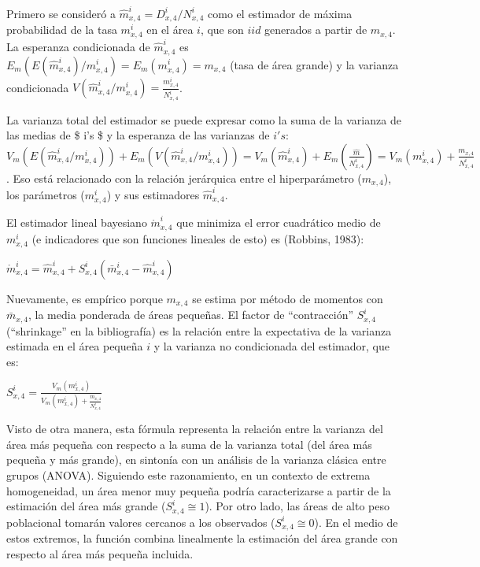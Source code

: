 \documentclass[12pt,]{article}
\begin{document}
Primero se consideró a \(\hat{m}_{x,4}^{i}=D_{x,4}^{i}/N_{x,4}^{i}\)
como el estimador de máxima probabilidad de la tasa \(m_{x,4}^{i}\) en
el área \(i\), que son \(iid\) generados a partir de \(m_{x,4}\). La
esperanza condicionada de \(\hat{m}_{x,4}^{i}\) es
\(E_{m}(E({\hat{m}}_{x,4}^{i})/m_{x,4}^{i})=E_{m}({m_{x, 4}^{i}}) = m_{x,4}\)
(tasa de área grande) y la varianza condicionada
\(V({\hat{m}}_{x,4}^{i}/m_{x,4}^{i})=\frac{m_{x,4}^{i}}{N_{x,4}^{i}}\).

La varianza total del estimador se puede expresar como la suma de la
varianza de las medias de \$ i's \$ y la esperanza de las varianzas de
\(i's\):
\(V_{m}(E(\hat{m}_{x,4}^{i}/m_{x,4}^{i}))+E_{m}(V({\hat{m}}_{x,4}^ {i}/m_{x,4}^{i}))=V_{m}(\hat{m}_{x,4}^{i})+E_{m}(\frac{{\hat{m}}}{N_{x,4}^{i}})=V_{m}(m_{x,4}^{i})+\frac{m_{x, 4}}{N_{x,4}^{i}}\).
Eso está relacionado con la relación jerárquica entre el hiperparámetro
(\(m_{x, 4}\)), los parámetros (\(m_{x,4}^{i}\)) y sus estimadores
\(\hat{m}_{x,4}^{i}\).

El estimador lineal bayesiano \(\mathring{m}_{x, 4}^{i}\) que minimiza
el error cuadrático medio de \({m}_{x,4}^{i}\) (e indicadores que son
funciones lineales de esto) es (Robbins, 1983):

\(\mathring{m}_{x,4}^{i}=\hat{m}_{x, 4}^{i}+S_{x,4}^{i}(\bar{m}_{x,4}^{i}-\hat{m}_{x,4}^{i})\)

Nuevamente, es empírico porque \(m_{x,4}\) se estima por método de
momentos con \(\bar{m}_{x,4}\), la media ponderada de áreas pequeñas. El
factor de ``contracción'' \(S_{x, 4}^{i}\) (``shrinkage'' en la
bibliografía) es la relación entre la expectativa de la varianza
estimada en el área pequeña \(i\) y la varianza no condicionada del
estimador, que es:

\(S_{x,4}^{i}=\frac{V_{m}(m_{x,4}^{i})}{V_{m}(m_{x,4}^{i})+\frac{m_{x,4}}{N_{x,4}^{i}}}\)

Visto de otra manera, esta fórmula representa la relación entre la
varianza del área más pequeña con respecto a la suma de la varianza
total (del área más pequeña y más grande), en sintonía con un análisis
de la varianza clásica entre grupos (ANOVA). Siguiendo este
razonamiento, en un contexto de extrema homogeneidad, un área menor muy
pequeña podría caracterizarse a partir de la estimación del área más
grande (\(S_{x, 4} ^ {i} \cong 1\)). Por otro lado, las áreas de alto
peso poblacional tomarán valores cercanos a los observados
(\(S_{x,4}^{i}\cong 0\)). En el medio de estos extremos, la función
combina linealmente la estimación del área grande con respecto al área
más pequeña incluida.
\end{document}
